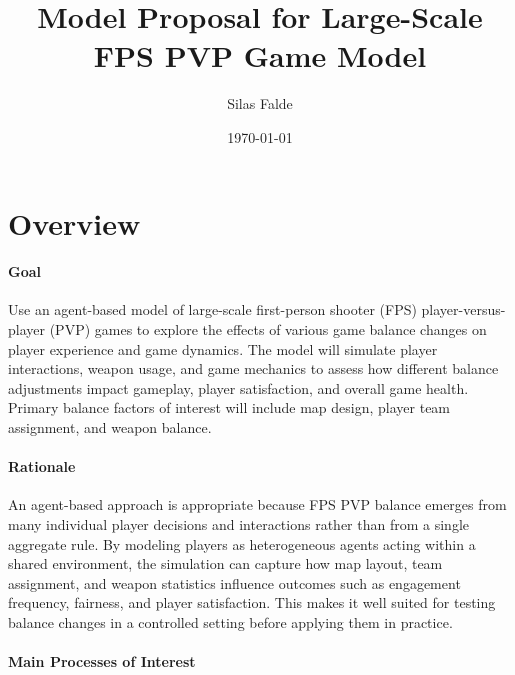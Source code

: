 \documentclass{assignment}
\title{Model Proposal for Large-Scale FPS PVP Game Model}
\author{Silas Falde}
\date\today
\begin{document}
\maketitle

\section{Overview}

\paragraph{Goal}

Use an agent-based model of large-scale first-person shooter (FPS) player-versus-player (PVP) games to explore the effects of various game balance changes on player experience and game dynamics. The model will simulate player interactions, weapon usage, and game mechanics to assess how different balance adjustments impact gameplay, player satisfaction, and overall game health. Primary balance factors of interest will include map design, player team assignment, and weapon balance.

\paragraph{Rationale}

An agent-based approach is appropriate because FPS PVP balance emerges from many individual player decisions and interactions rather than from a single aggregate rule. By modeling players as heterogeneous agents acting within a shared environment, the simulation can capture how map layout, team assignment, and weapon statistics influence outcomes such as engagement frequency, fairness, and player satisfaction. This makes it well suited for testing balance changes in a controlled setting before applying them in practice.

\paragraph{Main Processes of Interest}
\end{document}
